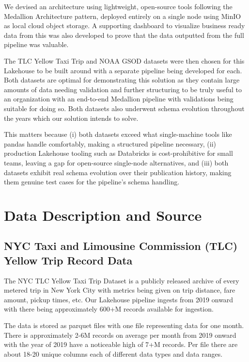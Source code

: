 \documentclass[conference]{IEEEtran}
\begin{document}
We devised an architecture using lightweight, open-source tools following the Medallion Architecture pattern, deployed entirely on a single node using MinIO as local cloud object storage. A supporting dashboard to visualize business ready data from this was also developed to prove that the data outputted from the full pipeline was valuable.

The TLC Yellow Taxi Trip and NOAA GSOD datasets were then chosen for this Lakehouse to be built around with a separate pipeline being developed for each. Both datasets are optimal for demonstrating this solution as they contain large amounts of data needing validation and further structuring to be truly useful to an organization with an end-to-end Medallion pipeline with validations being suitable for doing so. Both datasets also underwent schema evolution throughout the years which our solution intends to solve.

This matters because (i) both datasets exceed what single-machine tools like pandas handle comfortably, making a structured pipeline necessary, (ii) production Lakehouse tooling such as Databricks is cost-prohibitive for small teams, leaving a gap for open-source single-node alternatives, and (iii) both datasets exhibit real schema evolution over their publication history, making them genuine test cases for the pipeline's schema handling.

\section{Data Description and Source}
\label{sec:data}

\subsection{NYC Taxi and Limousine Commission (TLC) Yellow Trip Record Data\cite{tlc}}
    
The NYC TLC Yellow Taxi Trip Dataset is a publicly released archive
of every metered trip in New York City with metrics being given on trip distance, fare amount, pickup times, etc. Our Lakehouse pipeline ingests from 2019 onward with there being approximately 600+M records available for ingestion. 

The data is stored as parquet files with one file representing data for one month. There is approximately 2-6M records on average per month from 2019 onward with the year of 2019 have a noticeable high of 7+M records. Per file there are about 18-20 unique columns each of different data types and data ranges.
\end{document}
